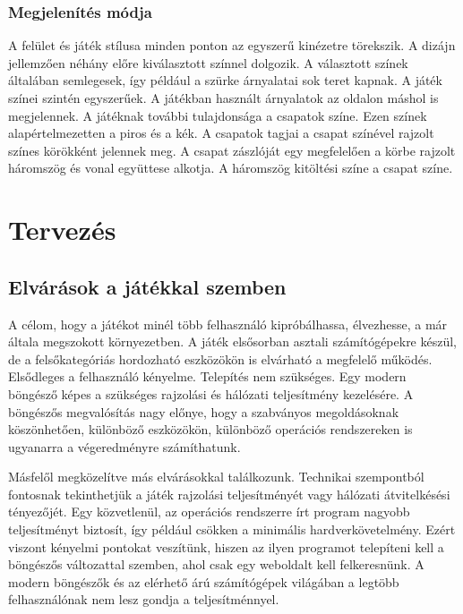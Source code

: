 \documentclass[]{article}
\begin{document}
\hypertarget{megjelenuxedtuxe9s-muxf3dja}{%
\subsubsection{Megjelenítés módja}\label{megjelenuxedtuxe9s-muxf3dja}}

A felület és játék stílusa minden ponton az egyszerű kinézetre
törekszik. A dizájn jellemzően néhány előre kiválasztott színnel
dolgozik. A választott színek általában semlegesek, így például a szürke
árnyalatai sok teret kapnak. A játék színei szintén egyszerűek. A
játékban használt árnyalatok az oldalon máshol is megjelennek. A
játéknak további tulajdonsága a csapatok színe. Ezen színek
alapértelmezetten a piros és a kék. A csapatok tagjai a csapat színével
rajzolt színes körökként jelennek meg. A csapat zászlóját egy
megfelelően a körbe rajzolt háromszög és vonal együttese alkotja. A
háromszög kitöltési színe a csapat színe.

\hypertarget{tervezuxe9s}{%
\section{Tervezés}\label{tervezuxe9s}}

\hypertarget{elvuxe1ruxe1sok-a-juxe1tuxe9kkal-szemben}{%
\subsection{Elvárások a játékkal
szemben}\label{elvuxe1ruxe1sok-a-juxe1tuxe9kkal-szemben}}

A célom, hogy a játékot minél több felhasználó kipróbálhassa,
élvezhesse, a már általa megszokott környezetben. A játék elsősorban
asztali számítógépekre készül, de a felsőkategóriás hordozható
eszközökön is elvárható a megfelelő működés. Elsődleges a felhasználó
kényelme. Telepítés nem szükséges. Egy modern böngésző képes a szükséges
rajzolási és hálózati teljesítmény kezelésére. A böngészős megvalósítás
nagy előnye, hogy a szabványos megoldásoknak köszönhetően, különböző
eszközökön, különböző operációs rendszereken is ugyanarra a
végeredményre számíthatunk.

Másfelől megközelítve más elvárásokkal találkozunk. Technikai
szempontból fontosnak tekinthetjük a játék rajzolási teljesítményét vagy
hálózati átvitelkésési tényezőjét. Egy közvetlenül, az operációs
rendszerre írt program nagyobb teljesítményt biztosít, így például
csökken a minimális hardverkövetelmény. Ezért viszont kényelmi pontokat
veszítünk, hiszen az ilyen programot telepíteni kell a böngészős
változattal szemben, ahol csak egy weboldalt kell felkeresnünk. A modern
böngészők és az elérhető árú számítógépek világában a legtöbb
felhasználónak nem lesz gondja a teljesítménnyel.
\end{document}
